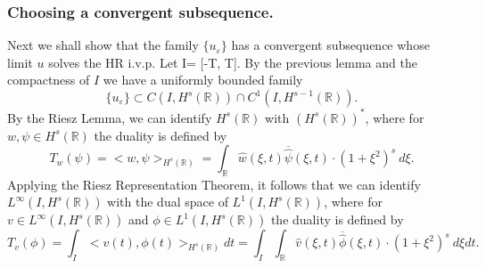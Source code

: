 \documentclass{beamer}
\newcommand{\rr}{\mathbb{R}}
\newcommand{\ee}{\varepsilon}
\begin{document}
\begin{frame}
	\frametitle{Choosing  a convergent subsequence.}
%
Next we shall show that the family $\{ u_\ee\}$ has a convergent 
subsequence
whose limit $u$ solves the HR i.v.p.  Let I= [-T, T]. By the previous lemma and the compactness of $I$ we have a uniformly bounded 
family
%
%
%
\begin{equation*}
\label{Lip-1-fam}
\{u_\ee\}\subset C(I, H^s(\rr))\cap C^1(I,
H^{s-1}(\rr)).
\end{equation*}
%
%
%
%
By the Riesz Lemma, we can identify $H^s(\rr)$ with
$(H^s(\rr))^*$, where for $w, \psi \in H^s(\rr)$ the duality is
defined by 
\begin{equation*}
	T_w(\psi) = <w, \psi>_{H^s(\rr)} = \int_{\rr}
\widehat{w}(\xi, t) \overline{\widehat{\psi}}(\xi, t) \cdot (1
+ \xi^2)^s \ d \xi.
\end{equation*}
Applying the Riesz Representation Theorem, it follows that we 
can identify $L^\infty(I, H^s(\rr)) $ with the dual space of $L^1(I,
H^{s}(\rr))$, where for $v\in L^\infty(I, H^s(\rr)) $ and $ \phi \in
L^1(I, H^{s}(\rr))$ the duality is defined by  
%
%
%
\begin{equation*}
T_v(\phi) = \int_I <v (t), \phi (t)>_{H^s(\rr)} dt  = \int_I
\int_{\rr}
\widehat{v}(\xi, t) \overline{\widehat{\phi}}(\xi, t) \cdot (1
+ \xi^2)^s \ d \xi dt.
\end{equation*}
%
%
%
\end{frame}
\end{document}
